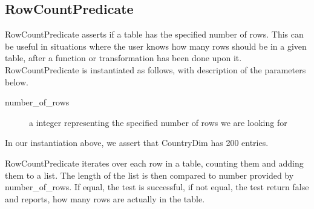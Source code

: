 \subsection{RowCountPredicate}
RowCountPredicate asserts if a table has the specified number of rows. This can be useful in situations where the user knows how many rows should be in a given table, after a function or transformation has been done upon it. RowCountPredicate is instantiated as follows, with description of the parameters below.


\begin{description}
\item [number\_of\_rows] a integer representing the specified number of rows we are looking for
\end{description}

In our instantiation above, we assert that CountryDim has 200 entries.  

RowCountPredicate iterates over each row in a table, counting them and adding them to a list. The length of the list is then compared to number provided by number\_of\_rows. If equal, the test is successful, if not equal, the test return false and reports, how many rows are actually in the table.


